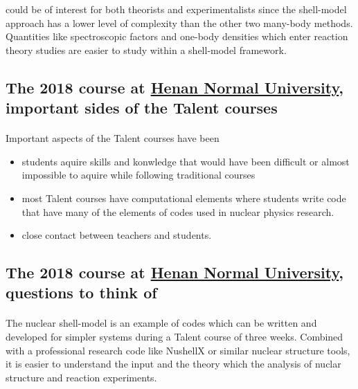 \documentclass[%
oneside,                 %
final,                   %
10pt]{article}
\begin{document}
\noindent
could be of interest for both theorists and experimentalists since the shell-model approach has a lower level of complexity than the other two many-body methods.
Quantities like spectroscopic factors and one-body densities which enter reaction theory studies are easier to study within a shell-model framework.




\subsection{The 2018 course at \href{{http://www.htu.cn/english/}}{Henan Normal University}, important sides of the Talent courses}

\paragraph{}
Important aspects of the Talent courses have been
\begin{itemize}
\item students aquire skills and konwledge that would have been difficult or almost impossible to aquire while following traditional courses

\item most Talent courses have computational elements where students write code that have many of the elements of codes used in nuclear physics research.

\item close contact between teachers and students. 
\end{itemize}

\noindent




\subsection{The 2018 course at \href{{http://www.htu.cn/english/}}{Henan Normal University}, questions to think of}

\paragraph{}

The nuclear shell-model is an example of codes which can be written and developed for simpler systems during a Talent course of three weeks. Combined with a professional research code like NushellX or similar nuclear structure tools, it is easier to understand the input and the theory which the analysis of nuclar structure and reaction experiments. 
\end{document}
